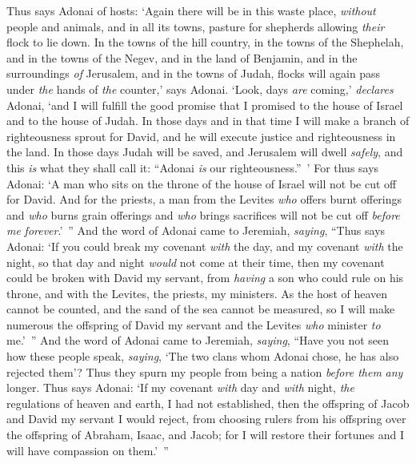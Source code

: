 \begin{biblechapter}
\verse Thus says Adonai of hosts: ‘Again there will be in this waste place, \textit{without} people and animals, and in all its towns, pasture for shepherds allowing \textit{their} flock to lie down.
\verse In the towns of the hill country, in the towns of the Shephelah, and in the towns of the Negev, and in the land of Benjamin, and in the surroundings \textit{of} Jerusalem, and in the towns of Judah, flocks will again pass under \textit{the} hands of \textit{the} counter,’ says Adonai.
\verse ‘Look, days \textit{are} coming,’ \textit{declares} Adonai, ‘and I will fulfill the good promise that I promised to the house of Israel and to the house of Judah.
\verse In those days and in that time I will make a branch of righteousness sprout for David, and he will execute justice and righteousness in the land.
\verse In those days Judah will be saved, and Jerusalem will dwell \textit{safely}, and this \textit{is} what they shall call it: “Adonai \textit{is} our righteousness.” ’
\verse For thus says Adonai: ‘A man who sits on the throne of the house of Israel will not be cut off for David.
\verse And for the priests, a man from the Levites \textit{who} offers burnt offerings and \textit{who} burns grain offerings and \textit{who} brings sacrifices will not be cut off \textit{before me} \textit{forever}.’ ”
\verse And the word of Adonai came to Jeremiah, \textit{saying},
\verse “Thus says Adonai: ‘If you could break my covenant \textit{with} the day, and my covenant \textit{with} the night, so that day and night \textit{would} not come at their time,
\verse then my covenant could be broken with David my servant, from \textit{having} a son who could rule on his throne, and with the Levites, the priests, my ministers.
\verse As the host of heaven cannot be counted, and the sand of the sea cannot be measured, so I will make numerous the offspring of David my servant and the Levites \textit{who} minister \textit{to} me.’ ”
\verse And the word of Adonai came to Jeremiah, \textit{saying},
\verse “Have you not seen how these people speak, \textit{saying}, ‘The two clans whom Adonai chose, he has also rejected them’? Thus they spurn my people from being a nation \textit{before them} \textit{any} longer.
\verse Thus says Adonai: ‘If my covenant \textit{with} day and \textit{with} night, \textit{the} regulations of heaven and earth, I had not established,
\verse then the offspring of Jacob and David my servant I would reject, from choosing rulers from his offspring over the offspring of Abraham, Isaac, and Jacob; for I will restore their fortunes and I will have compassion on them.’ ”
\end{biblechapter}

